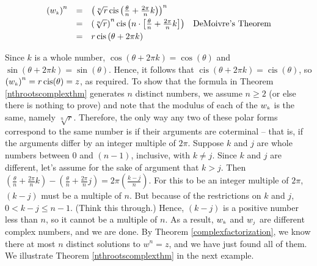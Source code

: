 \[ \begin{array}{rcll}

\left(w_{\text{\tiny$k$}}\right)^n & = & \left(\sqrt[n]{r}\operatorname{cis}\left(\frac{\theta}{n} + \frac{2\pi}{n} k \right)\right)^n & \\ [3pt]
																	 & = & \left(\sqrt[n]{r}\right)^{n} \operatorname{cis}\left( n \cdot \left[\frac{\theta}{n} + \frac{2\pi}{n} k \right] \right) & \text{DeMoivre's Theorem}\\ [3pt]
																	 & = & r \operatorname{cis}\left(\theta + 2\pi k\right) & \\ \end{array} \]
																	 
Since $k$ is a whole number, $\cos(\theta + 2\pi k) = \cos(\theta)$ and $\sin(\theta + 2\pi k) = \sin(\theta)$. Hence, it follows that $\operatorname{cis}(\theta + 2\pi k) = \operatorname{cis}(\theta)$, so $\left(w_{\text{\tiny$k$}}\right)^n = r \operatorname{cis}(\theta) = z$, as required.  To show that the formula in Theorem  \ref{nthrootscomplexthm} generates $n$ distinct numbers, we assume $n \geq 2$ (or else there is nothing to prove) and note that the modulus of each of the  $w_{\text{\tiny$k$}}$  is the same, namely $\sqrt[n]{r}$.  Therefore, the only way any two of these polar forms correspond to  the same number is if their arguments are coterminal -- that is, if the arguments differ by an integer multiple of $2\pi$. Suppose $k$ and $j$ are whole numbers between $0$ and $(n-1)$, inclusive,  with $k \neq j$.  Since $k$ and $j$ are different, let's assume for the sake of argument that  $k > j$.  Then $\left( \frac{\theta}{n} + \frac{2\pi}{n} k \right)  - \left( \frac{\theta}{n} + \frac{2\pi}{n} j \right) = 2\pi \left(\frac{k-j}{n}\right)$. For this to be an integer multiple of $2\pi$, $(k-j)$ must be a multiple of $n$.  But because of the restrictions on $k$ and $j$, $0 < k - j \leq n-1$. (Think this through.)  Hence, $(k-j)$ is a positive number less  than $n$, so it cannot be a multiple of $n$.  As a result, $w_{\text{\tiny$k$}}$ and $w_{\text{\tiny$j$}}$ are different complex numbers, and we are done.  By Theorem  \ref{complexfactorization}, we know there at most $n$ distinct solutions to $w^{n} = z$, and we have just found all of them.   We illustrate Theorem \ref{nthrootscomplexthm} in the next example.

\medskip

